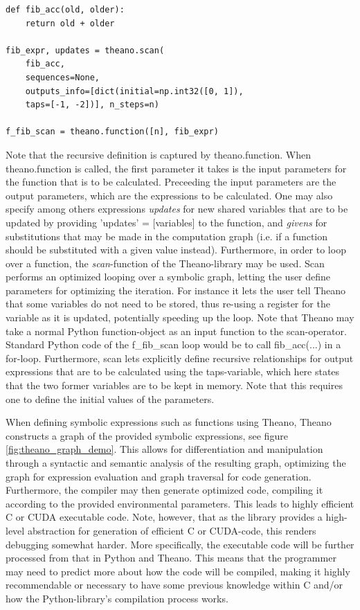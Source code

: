 \begin{verbatim}
def fib_acc(old, older):
    return old + older

fib_expr, updates = theano.scan(
    fib_acc,
    sequences=None,
    outputs_info=[dict(initial=np.int32([0, 1]), 
    taps=[-1, -2])], n_steps=n)

f_fib_scan = theano.function([n], fib_expr)
\end{verbatim}

Note that the recursive definition is captured by theano.function. When theano.function is called, the first parameter it takes is the input parameters for the function that is to be calculated. 
Preceeding the input parameters are the output parameters, which are the expressions to be calculated. One may also specify among others expressions \textit{updates} for new shared variables that are to be updated by providing 'updates' = [variables] to the function, and \textit{givens} for substitutions that may be made in the computation graph (i.e. if a function should be substituted with a given value instead).
Furthermore, in order to loop over a function, the \textit{scan}-function of the Theano-library may be used. Scan performs an optimized looping over a symbolic graph, letting the user define parameters for optimizing the iteration. For instance it lets the user tell Theano that some variables do not need to be stored, thus re-using a register for the variable as it is updated, potentially speeding up the loop.
Note that Theano may take a normal Python function-object as an input function to the scan-operator. Standard Python code of the f\_fib\_scan loop would be to call fib\_acc(...) in a for-loop. Furthermore, scan lets explicitly define recursive relationships for output expressions that are to be calculated using the taps-variable, which here states that the two former variables are to be kept in memory. Note that this requires one to define the initial values of the parameters.

When defining symbolic expressions such as functions using Theano, Theano constructs a graph of the provided symbolic expressions, see figure \ref{fig:theano_graph_demo}. This allows for differentiation and manipulation through a syntactic and semantic analysis of the resulting graph, optimizing the graph for expression evaluation and graph traversal for code generation. Furthermore, the compiler may then generate optimized code, compiling it according to the provided environmental parameters. This leads to highly efficient C or CUDA executable code.
Note, however, that as the library provides a high-level abstraction for generation of efficient C or CUDA-code, this renders debugging somewhat harder. More specifically, the executable code will be further processed from that in Python and Theano. This means that the programmer may need to predict more about how the code will be compiled, making it highly recommendable or necessary to have some previous knowledge within C and/or how the Python-library's compilation process works.

